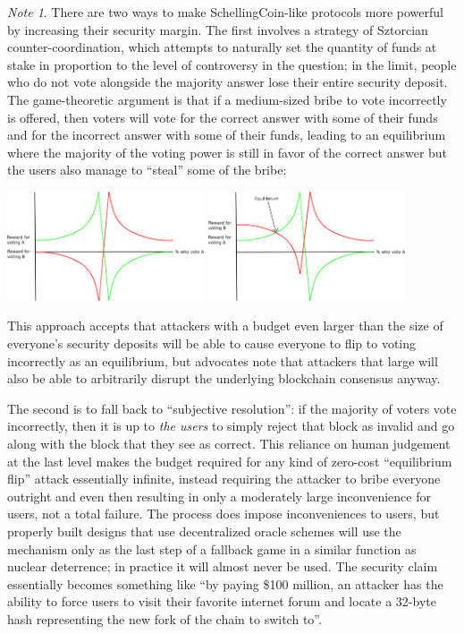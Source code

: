 \documentclass[11pt,a4paper]{report}
\theoremstyle{plain}
\theoremstyle{definition}
\theoremstyle{remark}
\newtheorem*{note}{Note}
\begin{document}
\begin{note}
There are two ways to make SchellingCoin-like protocols more powerful by increasing their security margin. The first involves a strategy of Sztorcian counter-coordination\cite{sztorc}, which attempts to naturally set the quantity of funds at stake in proportion to the level of controversy in the question; in the limit, people who do not vote alongside the majority answer lose their entire security deposit. The game-theoretic argument is that if a medium-sized bribe to vote incorrectly is offered, then voters will vote for the correct answer with some of their funds and for the incorrect answer with some of their funds, leading to an equilibrium where the majority of the voting power is still in favor of the correct answer but the users also manage to ``steal'' some of the bribe:

\begin{center}
\includegraphics[width=165pt]{schellingcoin_payoff1.png}
\includegraphics[width=165pt]{schellingcoin_payoff2.png}
\end{center}

This approach accepts that attackers with a budget even larger than the size of everyone's security deposits will be able to cause everyone to flip to voting incorrectly as an equilibrium, but advocates note that attackers that large will also be able to arbitrarily disrupt the underlying blockchain consensus anyway.

The second is to fall back to ``subjective resolution'': if the majority of voters vote incorrectly, then it is up to \emph{the users} to simply reject that block as invalid and go along with the block that they see as correct. This reliance on human judgement at the last level makes the budget required for any kind of zero-cost ``equilibrium flip'' attack essentially infinite, instead requiring the attacker to bribe everyone outright and even then resulting in only a moderately large inconvenience for users, not a total failure. The process does impose inconveniences to users, but properly built designs that use decentralized oracle schemes will use the mechanism only as the last step of a fallback game in a similar function as nuclear deterrence; in practice it will almost never be used. The security claim essentially becomes something like ``by paying \$100 million, an attacker has the ability to force users to visit their favorite internet forum and locate a 32-byte hash representing the new fork of the chain to switch to''.
\end{note}
\end{document}
